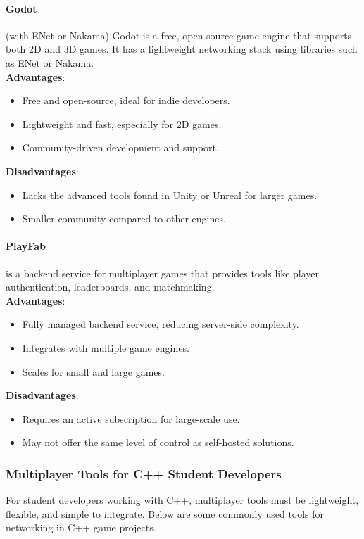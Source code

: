 \documentclass{article} %
\begin{document}
\paragraph{Godot} (with ENet or Nakama) Godot is a free,
open-source game engine that supports both 2D and 3D games.
It has a lightweight networking stack using libraries such as ENet or Nakama.
\\
\textbf{Advantages}:
\begin{itemize}
	\item Free and open-source, ideal for indie developers.
	\item Lightweight and fast, especially for 2D games.
	\item Community-driven development and support.
\end{itemize}
\textbf{Disadvantages}:
\begin{itemize}
	\item Lacks the advanced tools found in Unity or Unreal for larger games.
	\item Smaller community compared to other engines.
\end{itemize}

\paragraph{PlayFab} is a backend service for multiplayer games that provides tools like player authentication, leaderboards, and matchmaking.
\\
\textbf{Advantages}:
\begin{itemize}
	\item Fully managed backend service, reducing server-side complexity.
	\item Integrates with multiple game engines.
	\item Scales for small and large games.
\end{itemize}
\textbf{Disadvantages}:
\begin{itemize}
	\item Requires an active subscription for large-scale use.
	\item May not offer the same level of control as self-hosted solutions.
\end{itemize}

\subsubsection{Multiplayer Tools for C++ Student Developers}
For student developers working with C++,
multiplayer tools must be lightweight, flexible, and simple to integrate.
Below are some commonly used tools for networking in C++ game projects.
\end{document}
